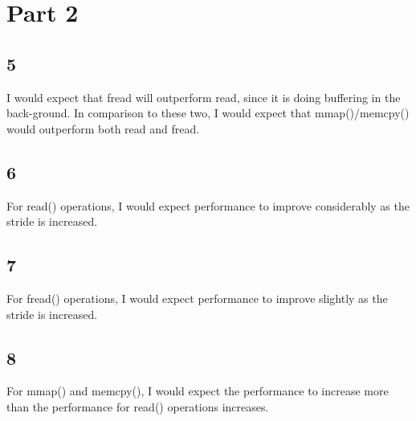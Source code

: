 \documentclass[]{scrartcl}
\begin{document}
\section*{Part 2}
\subsection*{5}
I would expect that fread will outperform read, since it is doing buffering in the back-ground. In comparison to these two, I would expect that mmap()/memcpy() would
outperform both read and fread.
\subsection*{6}
For read() operations, I would expect performance to improve considerably as the stride
is increased.
\subsection*{7}
For fread() operations, I would expect performance to improve slightly as the stride is increased.
\subsection{8}
For mmap() and memcpy(), I would expect the performance to increase more than the performance for read() operations increases.
\end{document}
